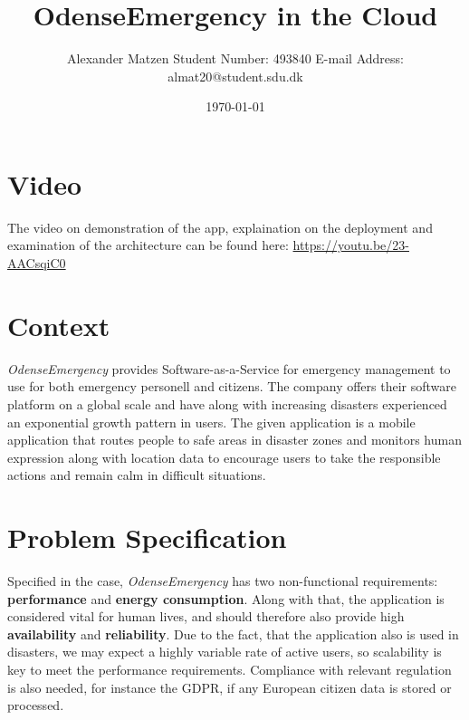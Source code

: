 \documentclass[11pt]{article}
\begin{document}
\setlength\parindent{0pt}
\setlength{\parskip}{.15em}
\pagestyle{empty}

\title{OdenseEmergency in the Cloud \newline}
\author{Alexander Matzen \addvspace{1em} Student Number: 493840 \newline E-mail Address: almat20@student.sdu.dk}
\date{\today}


\pagecolor{white}

\tableofcontents
\newpage

\section{Video}
The video on demonstration of the app, explaination on the deployment and examination of the architecture can be found here: \href{https://youtu.be/23-AACsqiC0}{https://youtu.be/23-AACsqiC0}

\section{Context}

\textit{OdenseEmergency} provides Software-as-a-Service for emergency management to use for both emergency personell and citizens. The company offers their software platform on a global scale and have along with increasing disasters experienced an exponential growth pattern in users.
\newline\newline
The given application is a mobile application that routes people to safe areas in disaster zones and monitors human expression along with location data to encourage users to take the responsible actions and remain calm in difficult situations.

\section{Problem Specification}

Specified in the case, \textit{OdenseEmergency} has two non-functional requirements: \textbf{performance} and \textbf{energy consumption}. Along with that, the application is considered vital for human lives, and should therefore also provide high \textbf{availability} and \textbf{reliability}.
\newline\newline
Due to the fact, that the application also is used in disasters, we may expect a highly variable rate of active users, so scalability is key to meet the performance requirements.
\newline\newline
Compliance with relevant regulation is also needed, for instance the GDPR, if any European citizen data is stored or processed.
\end{document}

